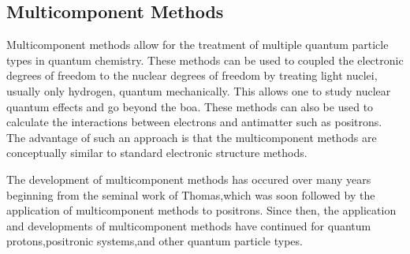 \subsection{Multicomponent Methods}
Multicomponent methods allow for the treatment of multiple quantum particle types in quantum chemistry.
These methods can be used to coupled the electronic degrees of freedom to the nuclear degrees of freedom by treating light nuclei, usually only hydrogen, quantum mechanically.\citehere
This allows one to study nuclear quantum effects and go beyond the \gls{boa}.
These methods can also be used to calculate the interactions between electrons and antimatter such as positrons.\citehere
The advantage of such an approach is that the multicomponent methods are conceptually similar to standard electronic structure methods.

The development of multicomponent methods has occured over many years beginning from the seminal work of Thomas,\citehere which was soon followed by the application of multicomponent methods to positrons.\citehere
Since then, the application and developments of multicomponent methods have continued for quantum protons,\citehere positronic systems,\citehere and other quantum particle types.\citehere


